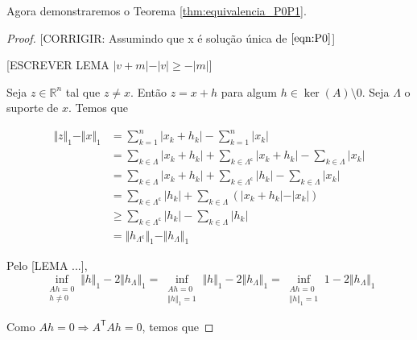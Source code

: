 

Agora demonstraremos o Teorema \ref{thm:equivalencia_P0P1}.
\begin{proof}

[CORRIGIR: Assumindo que x é solução única de $\eqref{eqn:P0}$]

[ESCREVER LEMA $\vert v + m\vert - \vert v \vert \geq -\vert m \vert$]

Seja $z \in \mathbb{R}^n$ tal que $z \neq x$. Então $z = x + h$ para algum $h \in \ker(A) \setminus{0}$.
Seja $\Lambda$ o suporte de $x$. Temos que

\begin{subequations}
\begin{align*}
\Vert z \Vert_1 - \Vert x \Vert_1 &
= \sum_{k = 1}^n \vert x_k + h_k \vert - \sum_{k = 1}^n \vert x_k \vert \\
& = \sum_{k \in \Lambda} \vert x_k + h_k \vert +
\sum_{k \in \Lambda^{\mathsf{c}}} \vert x_k + h_k \vert
- \sum_{k \in \Lambda} \vert x_k \vert \\
& = \sum_{k \in \Lambda} \vert x_k + h_k \vert +
\sum_{k \in \Lambda^{\mathsf{c}}} \vert h_k \vert
- \sum_{k \in \Lambda} \vert x_k \vert \\
& = \sum_{k \in \Lambda^{\mathsf{c}}} \vert h_k \vert
+ \sum_{k \in \Lambda} \left( \vert x_k + h_k \vert - \vert x_k \vert \right) \\
& \geq \sum_{k \in \Lambda^{\mathsf{c}}} \vert h_k \vert
- \sum_{k \in \Lambda} \vert h_k \vert \\
& = \Vert h_{\Lambda^{\mathsf{c}}} \Vert_1 - \Vert h_\Lambda \Vert_1
\end{align*}
\end{subequations}

Pelo [LEMA ...],
$$\inf_{\substack{Ah = 0 \\ h \neq 0}} \Vert h \Vert_1 - 2 \Vert h_\Lambda \Vert_1
= \inf_{\substack{Ah = 0 \\ \Vert h \Vert_1 = 1}} \Vert h \Vert_1 - 2 \Vert h_\Lambda \Vert_1
= \inf_{\substack{Ah = 0 \\ \Vert h \Vert_1 = 1}} 1 - 2 \Vert h_\Lambda \Vert_1
$$

Como $Ah = 0 \Rightarrow A^{\mathsf{T}} A h = 0$, temos que


\end{proof}
